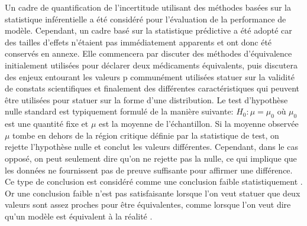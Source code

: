 
\label{ann:meth-stat-recens}
    Un cadre de quantification de l'incertitude utilisant des méthodes basées sur la statistique inférentielle a été considéré pour l'évaluation de la performance de modèle. Cependant, un cadre  basé sur la statistique prédictive a été adopté car des tailles d'effets n'étaient pas immédiatement apparents et ont donc été conservés en annexe. Elle commencera par discuter des méthodes d'équivalence initialement utilisées pour déclarer deux médicaments équivalents, puis discutera des enjeux entourant les valeurs p communément utilisées statuer sur la validité de constats scientifiques et finalement des différentes caractéristiques qui peuvent être utilisées pour statuer sur la forme d'une distribution.
            Le test d'hypothèse nulle standard est typiquement formulé de la manière suivante: $H_0: \mu = \mu_0 $ où $\mu_0$ est une quantité fixe et $\mu$ est la moyenne de l'échantillon. Si la moyenne observée $\mu$ tombe en dehors de la région critique définie par la statistique de test, on rejette l'hypothèse nulle et conclut les valeurs différentes. Cependant, dans le cas opposé, on peut seulement dire qu'on ne rejette pas la nulle, ce qui implique que les données ne fournissent pas de preuve suffisante pour affirmer une différence. Ce type de conclusion est considéré comme une conclusion faible statistiquement \parencite{hines_probabilites_2005}. Or une conclusion faible n'est pas satisfaisante lorsque l'on veut statuer que deux valeurs sont assez proches pour être équivalentes, comme lorsque l'on veut dire qu'un modèle est équivalent à la réalité \parencite{robinson_model_2004}. \par
